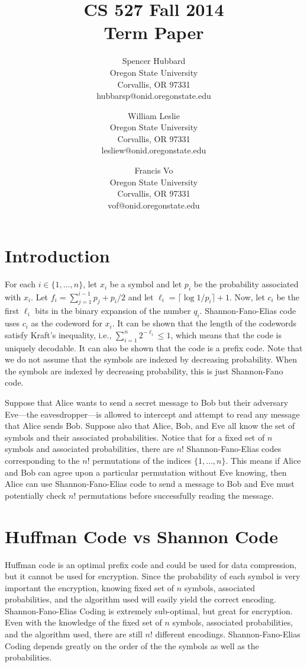 \documentclass[10pt,letterpaper,notitlepage,draft]{article}
\title{CS 527 Fall 2014\\Term Paper}
\author{\small
\small Spencer Hubbard\\
\small Oregon State University\\
\small Corvallis, OR 97331\\
\small hubbarsp@onid.oregonstate.edu
\and
\small William Leslie\\
\small Oregon State University\\
\small Corvallis, OR 97331\\
\small lesliew@onid.oregonstate.edu
\and
\small Francis Vo\\
\small Oregon State University\\
\small Corvallis, OR 97331\\
\small vof@onid.oregonstate.edu
} %
\date{} %
\theoremstyle{definition}
\begin{document}
\maketitle


\section{Introduction}
For each $i \in \lbrace 1, \ldots, n\rbrace$, let $x_i$ be a symbol and let $p_i$ be the probability associated with $x_i$. 
Let $f_i = \sum_{j=1}^{i-1} p_j + p_i / 2$ and let $\ell_i = \lceil\log 1 / p_i \rceil + 1$. 
Now, let $c_i$ be the first $\ell_i$ bits in the binary expansion of the number $q_i$. 
Shannon-Fano-Elias code uses $c_i$ as the codeword for $x_i$. 
It can be shown that the length of the codewords satisfy Kraft's inequality, i.e., $\sum_{i=1}^n 2^{-\ell_i} \le 1$, which means that the code is uniquely decodable. 
It can also be shown that the code is a prefix code. 
Note that we do not assume that the symbols are indexed by decreasing probability. 
When the symbols are indexed by decreasing probability, this is just Shannon-Fano code.

Suppose that Alice wants to send a secret message to Bob but their adversary Eve---the eavesdropper---is allowed to intercept and attempt to read any message that Alice sends Bob. 
Suppose also that Alice, Bob, and Eve all know the set of symbols and their associated probabilities. 
Notice that for a fixed set of $n$ symbols and associated probabilities, there are $n!$ Shannon-Fano-Elias codes corresponding to the $n!$ permutations of the indices $\lbrace 1, \dots, n\rbrace$. 
This means if Alice and Bob can agree upon a particular permutation without Eve knowing, then Alice can use Shannon-Fano-Elias code to send a message to Bob and Eve must potentially check $n!$ permutations before successfully reading the message.

\section{Huffman Code vs Shannon Code}
Huffman code is an optimal prefix code and could be used for data compression, but it cannot be used for encryption.
Since the probability of each symbol is very important the encryption, knowing fixed set of $n$ symbols, associated probabilities, and the algorithm used will easily yield the correct encoding. 
Shannon-Fano-Elias Coding is extremely sub-optimal, but great for encryption.
Even with the knowledge of the fixed set of $n$ symbols, associated probabilities, and the algorithm used, there are still $n!$ different encodings. 
Shannon-Fano-Elias Coding depends greatly on the order of the the symbols as well as the probabilities.
\end{document}
